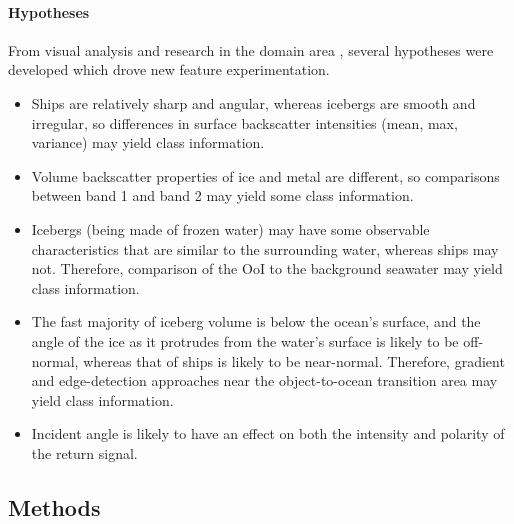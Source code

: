 \documentclass[fleqn,10pt]{SelfArx} %
\begin{document}
\paragraph{Hypotheses} From visual analysis and research in the domain area \cite{wesche} \cite{Ship-Iceberg_CNN} \cite{howell}, several hypotheses were developed which drove new feature experimentation.

\begin{itemize}
	\item Ships are relatively sharp and angular, whereas icebergs are smooth and irregular, so differences in surface backscatter intensities (mean, max, variance) may yield class information.
	\item Volume backscatter properties of ice and metal \cite{howell} are different, so comparisons between band 1 and band 2 may yield some class information.  
	\item Icebergs (being made of frozen water) may have some observable characteristics that are similar to the surrounding water, whereas ships may not.  Therefore, comparison of the OoI to the background seawater may yield class information.
	\item The fast majority of iceberg volume is below the ocean's surface, and the angle of the ice as it protrudes from the water's surface is likely to be off-normal, whereas that of ships is likely to be near-normal.  Therefore, gradient and edge-detection approaches near the object-to-ocean transition area may yield class information.
	\item Incident angle is likely to have an effect on both the intensity and polarity of the return signal. \cite{makynen}
\end{itemize}

\subsection{Methods}
\end{document}
